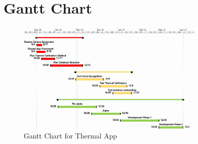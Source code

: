 \documentclass[12pt, letterpaper]{article}
\begin{document}
    \section{Gantt Chart}
    \begin{figure}[h!]
        \centering
        \includegraphics[width=0.8\textwidth]{Gantt Chart v3.jpg}
        \caption{Gantt Chart for Thermal App}
    \end{figure}
\end{document}
